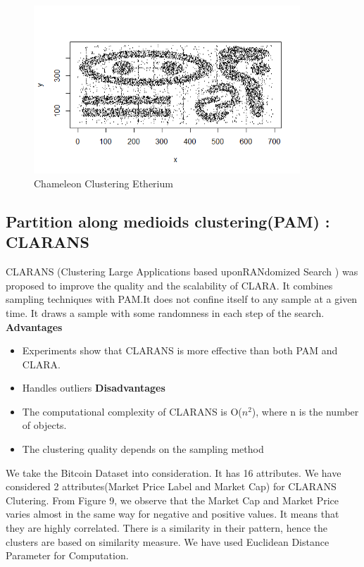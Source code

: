 \documentclass{article}
\begin{document}
\begin{figure}[h]
    \centering
    \includegraphics[width=10cm]{ChameleonEtheriumFig2.png}
    \caption{Chameleon Clustering Etherium}
    \label{fig:my_label}
\end{figure}

\newpage 
\subsection{Partition along medioids clustering(PAM) : CLARANS}
CLARANS (Clustering Large Applications based uponRANdomized Search ) was proposed to improve the quality and the scalability of CLARA. It combines sampling techniques with PAM.It does not confine itself to any sample at a given time. It draws a sample with some randomness in each step of the search.
\newline
\textbf{Advantages}
\begin {itemize}
\item Experiments show that CLARANS is more effective than both PAM
and CLARA.
\item Handles outliers 
\newline
\textbf{Disadvantages}
\item The computational complexity of CLARANS is O($n^2$), where n is the
number of objects.
\item The clustering quality depends on the sampling method
\end{itemize}

We take the Bitcoin Dataset into consideration. It has 16 attributes. We have considered 2 attributes(Market Price Label and Market Cap)  for CLARANS Clutering. From Figure 9, we observe that the Market Cap and Market Price varies almost in the same way for negative and positive values. It means that they are highly correlated. There is a similarity in their pattern, hence the clusters are based on similarity measure. We have used Euclidean Distance Parameter for Computation. 
\end{document}
